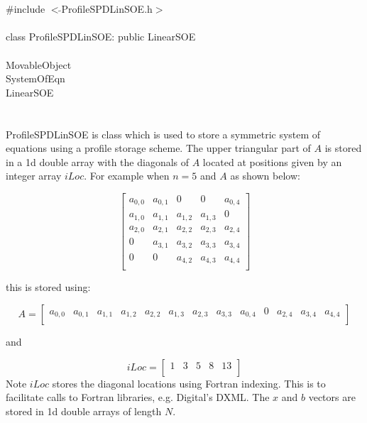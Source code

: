 
 \\

   \\
\indent \#include $<\tilde{ }$ProfileSPDLinSOE.h$>$  \\

  \\
\indent class ProfileSPDLinSOE: public LinearSOE \\

 \\
\indent MovableObject \\
\indent\indent SystemOfEqn \\
\indent\indent\indent LinearSOE \\
\indent\indent\indent{} \\

  \\
\indent ProfileSPDLinSOE is class which is used to store a symmetric
system of equations using a profile storage scheme. The upper
triangular part of $A$ is stored in a 1d double array with the diagonals of
$A$ located at positions given by an integer array $iLoc$. 
For example when $n=5$ and $A$ as shown below:

$$
\left[
\begin{array}{ccccc}
a_{0,0} & a_{0,1}  & 0 & 0 & a_{0,4} \\
a_{1,0} & a_{1,1} & a_{1,2} & a_{1,3} & 0 \\
a_{2,0} & a_{2,1} & a_{2,2} & a_{2,3} & a_{2,4}  \\
0 & a_{3,1} & a_{3,2} & a_{3,3} & a_{3,4} \\
0 & 0 & a_{4,2} & a_{4,3} & a_{4,4} \\
\end{array}
\right] 
$$

this is stored using:


$$ A =
\left[
\begin{array}{cccccccccccccccccccc}
a_{0,0} & a_{0,1}  & a_{1,1} & a_{1,2} & a_{2,2} & a_{1,3} &
a_{2,3} & a_{3,3} & a_{0,4} & 0 & a_{2,4} & a_{3,4} & a_{4,4}\\
\end{array}
\right] 
$$

and 

$$ iLoc =
\left[
\begin{array}{cccccccccccccccccccc}
1 & 3 & 5 & 8 & 13 \\
\end{array}
\right] 
$$
Note $iLoc$ stores the diagonal locations using Fortran indexing. This
is to facilitate calls to Fortran libraries, e.g. Digital's DXML.
The $x$ and $b$ vectors are stored in 1d double arrays of length $N$. \\


